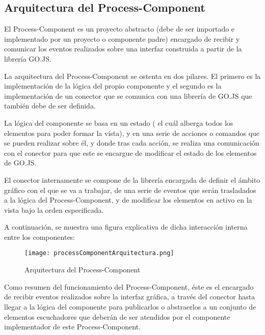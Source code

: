 \subsection{Arquitectura del Process-Component}

El Process-Component es un proyecto abstracto (debe de ser importado e implementado por un proyecto o componente padre) encargado de recibir y comunicar los eventos realizados sobre una interfaz construida a partir de la librería GO.JS.

\vspace{5mm}

La arquitectura del Process-Component se ostenta en dos pilares. El primero es la implementación de la lógica del propio componente y el segundo es la implementación de un conector que se comunica con una librería de GO.JS que también debe de ser definida.

\vspace{5mm}

La lógica del componente se basa en un estado ( el cuál alberga todos los elementos para poder formar la vista), y en una serie de acciones o comandos que se pueden realizar sobre él, y donde tras cada acción, se realiza una comunicación con el conector para que este se encargue de modificar el estado de los elementos de GO.JS.

\vspace{5mm}

El conector internamente se compone de la librería encargada de definir el ámbito gráfico con el que se va a trabajar, de una serie de eventos que serán trasladados a la lógica del Process-Component, y de modificar los elementos en activo en la vista bajo la orden especificada.

\vspace{5mm}

A continuación, se muestra una figura explicativa de dicha interacción interna entre los componentes:

\begin{figure}[H]
	\centering
	\texttt{[image: processComponentArquitectura.png]}
	\caption{Arquitectura del Process-Component}\label{fig:processComponent}
\end{figure}

Como resumen del funcionamiento del Process-Component, éste es el encargado de recibir eventos realizados sobre la interfaz gráfica, a través del conector hasta llegar a la lógica del componente para publicarlos o abstraerlos a un conjunto de elementos escuchadores que deberán de ser atendidos por el componente implementador de este Process-Component.
	 
